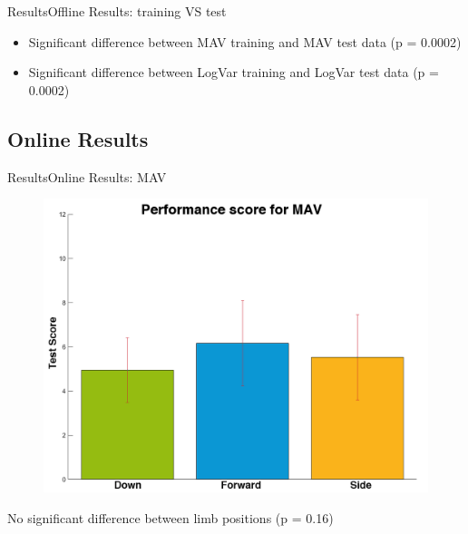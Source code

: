 \documentclass[10pt]{beamer}
\begin{document}
\begin{frame}{Results}{Offline Results: training VS test}
\begin{itemize}
	\item Significant difference between MAV training and MAV test data (p = 0.0002)
	\item Significant difference between LogVar training and LogVar test data (p = 0.0002)
\end{itemize}
\end{frame}


\subsection{Online Results}
\begin{frame}{Results}{Online Results: MAV}
\begin{figure}
	\includegraphics[scale=0.27]{figures/gotItMAV.png}
\end{figure}
No significant difference between limb positions (p = 0.16)
\end{frame}
\end{document}
